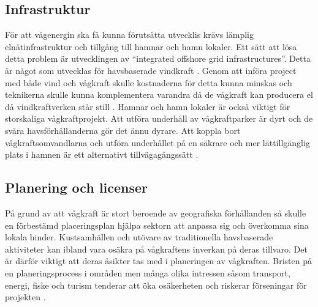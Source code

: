 \documentclass[10pt,a4paper,oneside]{article}
\begin{document}
\subsection{Infrastruktur}
För att vågenergin ska få kunna förutsätta utvecklis krävs lämplig elnätinfrastruktur och tillgång till hamnar och hamn lokaler. Ett sätt att lösa detta problem är utvecklingen av “integrated offshore grid infrastructures”. Detta är något som utvecklas för havsbaserade vindkraft \cite{IRENA}. Genom att införa project med både vind och vågkraft skulle kostnaderna för detta kunna minskas och teknikerna skulle kunna komplementera varandra då de vågkraft kan producera el då vindkraftverken står still \cite{Yale}. Hamnar och hamn lokaler är också viktigt för storskaliga vågkraftprojekt. Att utföra underhåll av vågkraftparker är dyrt och de svåra havsförhållanderna gör det ännu dyrare. Att koppla bort vågkraftsomvandlarna och utföra underhållet på en säkrare och mer lättillgänglig plats i hamnen är ett alternativt tillvägagångssätt \cite{IRENA}. 

\subsection{Planering och licenser}
På grund av att vågkraft är stort beroende av geografiska förhållanden så skulle en förbestämd placeringsplan hjälpa sektorn att anpassa sig och överkomma sina lokala hinder. Kustsamhällen och utövare av traditionella havsbaserade aktiviteter kan ibland vara osäkra på vågkraftens inverkan på deras tillvaro. Det är därför viktigt att deras åsikter tas med i planeringen av vågkraften. Bristen på en planeringsprocess i områden men många olika intressen såsom transport, energi, fiske och turism tenderar att öka osäkerheten och riskerar förseningar för projekten \cite{IRENA}. 
\end{document}
